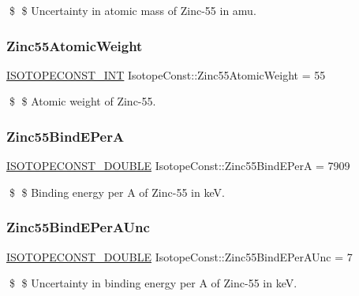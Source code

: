 \$ \$ Uncertainty in atomic mass of Zinc-\/55 in amu. \mbox{\label{group___isotope_const-_zinc-_zn55_gac44cccb250540486c1d771deec41b055}} 
\subsubsection{\texorpdfstring{Zinc55\+Atomic\+Weight}{Zinc55AtomicWeight}}
{\footnotesize\ttfamily \mbox{\hyperlink{group___isotope_const-_macros_ga5f18360b3e99483a35c32d789e62621c}{I\+S\+O\+T\+O\+P\+E\+C\+O\+N\+S\+T\+\_\+\+I\+NT}} Isotope\+Const\+::\+Zinc55\+Atomic\+Weight = 55}

\$ \$ Atomic weight of Zinc-\/55. \mbox{\label{group___isotope_const-_zinc-_zn55_ga52248dc49ea262ceb856bdd53f344221}} 
\subsubsection{\texorpdfstring{Zinc55\+Bind\+E\+PerA}{Zinc55BindEPerA}}
{\footnotesize\ttfamily \mbox{\hyperlink{group___isotope_const-_macros_ga8f45a7272ce02c0b4c65c44636ed719a}{I\+S\+O\+T\+O\+P\+E\+C\+O\+N\+S\+T\+\_\+\+D\+O\+U\+B\+LE}} Isotope\+Const\+::\+Zinc55\+Bind\+E\+PerA = 7909}

\$ \$ Binding energy per A of Zinc-\/55 in keV. \mbox{\label{group___isotope_const-_zinc-_zn55_ga0a2c3681bee7c9de7057269a1f13b4ba}} 
\subsubsection{\texorpdfstring{Zinc55\+Bind\+E\+Per\+A\+Unc}{Zinc55BindEPerAUnc}}
{\footnotesize\ttfamily \mbox{\hyperlink{group___isotope_const-_macros_ga8f45a7272ce02c0b4c65c44636ed719a}{I\+S\+O\+T\+O\+P\+E\+C\+O\+N\+S\+T\+\_\+\+D\+O\+U\+B\+LE}} Isotope\+Const\+::\+Zinc55\+Bind\+E\+Per\+A\+Unc = 7}

\$ \$ Uncertainty in binding energy per A of Zinc-\/55 in keV. \mbox{\label{group___isotope_const-_zinc-_zn55_ga99147263677f948588507fb03f07ca59}} 
